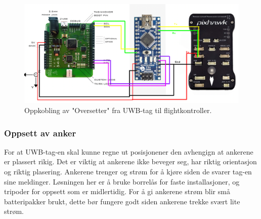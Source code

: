 \begin{figure}[htp]
\centering
\includegraphics[width=0.7\columnwidth]{figures/oppkobling}
\caption{Oppkobling av "Oversetter" fra UWB-tag til flightkontroller.}
\label{fig:oppkobling}
\end{figure}

\subsubsection{Oppsett av anker}
For at UWB-tag-en skal kunne regne ut posisjonener den avhengign at ankerene er plassert rikig. Det er viktig at ankerene ikke beveger seg, har riktig orientasjon og riktig plasering. Ankerene trenger og strøm for å kjøre siden de svarer tag-en sine meldinger. 
Løsningen her er å bruke borrelås for faste installasjoner, og tripoder for oppsett som er midlertidig.  For å gi ankerene strøm blir små batteripakker brukt, dette bør fungere godt siden ankerene trekke svært lite strøm. 
